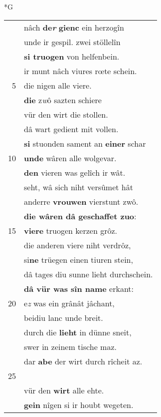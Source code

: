 \documentclass[8pt,a4paper,notitlepage]{article}
\begin{document}
\newpage
\begin{table}[ht]
\begin{minipage}[t]{0.5\linewidth}
\small
\begin{center}*G
\end{center}
\begin{tabular}{rl}
 & nâch \textbf{de\textit{r}} \textbf{gienc} ein herzogîn\\ 
 & unde ir gespil. zwei stöllelîn\\ 
 & \textbf{si truogen} von helfenbein.\\ 
 & ir munt nâch viures rœte schein.\\ 
5 & die nigen alle viere.\\ 
 & \textbf{die} z\textit{w}ô sazten schiere\\ 
 & vür den wirt die stollen.\\ 
 & dâ wart gedient mit vollen.\\ 
 & \textbf{si} stuonden sament an \textbf{einer} schar\\ 
10 & \textbf{unde} wâren alle wolgevar.\\ 
 & \textbf{den} vieren was gelîch ir wât.\\ 
 & seht, wâ sich niht versûmet hât\\ 
 & anderre \textbf{vrouwen} vierstunt zwô.\\ 
 & \textbf{die wâren dâ geschaffet zuo}:\\ 
15 & \textbf{viere} truogen kerzen grôz.\\ 
 & die anderen viere niht verdrôz,\\ 
 & si\textbf{ne} trüegen einen tiuren stein,\\ 
 & dâ tages diu sunne lieht durchschein.\\ 
 & \textbf{dâ vür was sîn name} erkant:\\ 
20 & e\textit{z} was ein grânât jâchant,\\ 
 & beidiu lanc unde breit.\\ 
 & durch die \textbf{lieht} in dünne sneit,\\ 
 & swer in zeinem tische maz.\\ 
 & dar \textbf{abe} der wirt durch rîcheit az.\\ 
25 & \textbf{\begin{large}S\end{large}i} giengen \textbf{alle} rehte\\ 
 & vür den \textbf{wirt} alle ehte.\\ 
 & \textbf{gein} nîgen si ir houbt wegeten.\\ 

\end{tabular}
\end{minipage}
\end{table}
\end{document}
